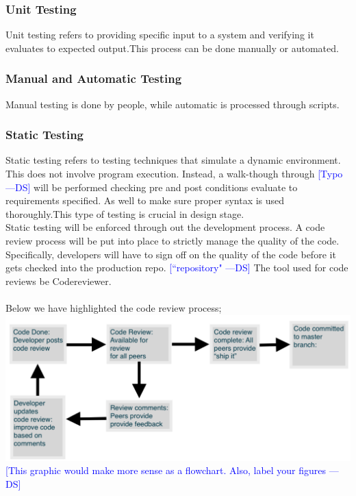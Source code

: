 \documentclass[12pt]{article}
\newcommand{\authornote}[3]{\textcolor{#1}{[#3 ---#2]}}
\newcommand{\authornote}[3]{}
\newcommand{\ds}[1]{\authornote{blue}{DS}{#1}}
\begin{document}
\subsubsection{Unit Testing}
Unit testing refers to providing specific input to a system and verifying it evaluates to expected output.This process can be done manually or automated.

\subsubsection{Manual and Automatic Testing}
Manual testing is done by people, while automatic is processed through scripts. 

\subsubsection{Static Testing}
Static testing refers to testing techniques that simulate a dynamic environment. This does not involve program execution. Instead, a walk-though through
\ds{Typo}
will be performed checking pre and post conditions evaluate to requirements specified. As well to make sure proper syntax is used thoroughly.This type of testing is crucial in design stage. \\
Static testing will be enforced through out the development process. A code review process will be put into place to strictly manage the quality of the code. Specifically, developers will have to sign off on the quality of the code before it gets checked into the production repo.
\ds{``repository"}
The tool used for code reviews be Codereviewer. \\\\
Below we have highlighted the code review process;\\
\includegraphics[width=\textwidth,height=\textheight,keepaspectratio]{review_process.png}
\ds{This graphic would make more sense as a flowchart. Also, label your figures}
\\\\
\end{document}
